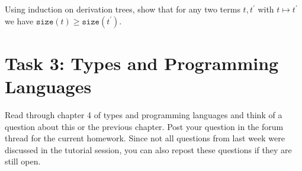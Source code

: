 Using induction on derivation trees, show that for any two terms $t,t^{\prime}$ with $t\mapsto t^{\prime}$ we have $\mathtt{size}(t) \geq \mathtt{size}(t^{\prime})$.

\section*{Task 3: Types and Programming Languages}
Read through chapter 4 of types and programming languages and think of a question about this or the previous chapter.
Post your question in the forum thread for the current homework.
Since not all questions from last week were discussed in the tutorial session, you can also repost these questions if they are still open.

